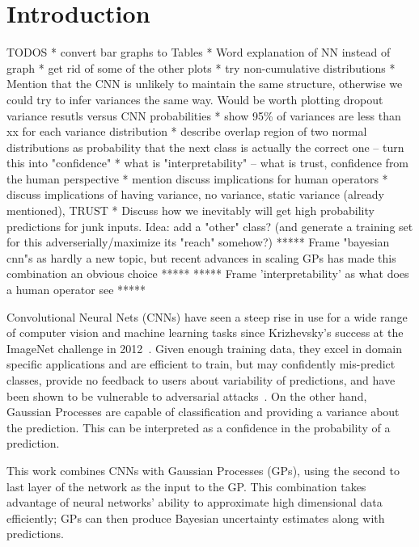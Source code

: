 \documentclass{article}
\begin{document}
\section{Introduction}

TODOS
* convert bar graphs to Tables
* Word explanation of NN instead of graph
* get rid of some of the other plots
* try non-cumulative distributions
* Mention that the CNN is unlikely to maintain the same structure, otherwise we could try to infer variances the same way. Would be worth plotting dropout variance resutls versus CNN probabilities
* show 95\% of variances are less than xx for each variance distribution
* describe overlap region of two normal distributions as probability that the next class is actually the correct one -- turn this into "confidence" 
* what is "interpretability" -- what is trust, confidence from the human perspective
* mention discuss implications for human operators
* discuss implications of having variance, no variance, static variance (already mentioned), TRUST
* Discuss how we inevitably will get high probability predictions for junk inputs. Idea: add a "other" class? (and generate a training set for this adverserially/maximize its "reach" somehow?)
***** Frame "bayesian cnn"s as hardly a new topic, but recent advances in scaling GPs has made this combination an obvious choice *****
***** Frame 'interpretability' as what does a human operator see *****



\label{sec:intro}

 
Convolutional Neural Nets (CNNs) have seen a steep rise in use for a wide range of computer vision and machine learning tasks since Krizhevsky's success at the ImageNet challenge in 2012~\cite{krizhevsky2012imagenet}. Given enough training data, they excel in domain specific applications and are efficient to train, but may confidently mis-predict classes, provide no feedback to users about variability of predictions, and have been shown to be vulnerable to adversarial attacks~\cite{szegedy2013intriguing}. On the other hand, Gaussian Processes are capable of classification and providing a variance about the prediction. This can be interpreted as a confidence in the probability of a prediction.

This work combines CNNs with Gaussian Processes (GPs), using the second to last layer of the network as the input to the GP. This combination takes advantage of neural networks' ability to approximate high dimensional data efficiently; GPs can then produce Bayesian uncertainty estimates along with predictions.
\end{document}
